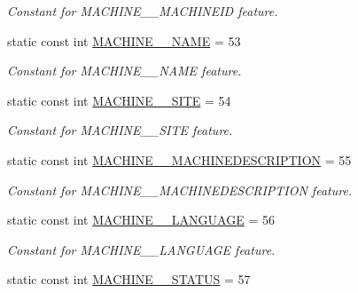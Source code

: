 \begin{DoxyCompactItemize}
\begin{DoxyCompactList}\small\item\em Constant for MACHINE\_\-\_\-MACHINEID feature. \item\end{DoxyCompactList}\item 
\hypertarget{classUMS__Data_1_1UMS__DataPackage_a709e9131404d168e154a3155b55ec1d5}{
static const int \hyperlink{classUMS__Data_1_1UMS__DataPackage_a709e9131404d168e154a3155b55ec1d5}{MACHINE\_\-\_\-NAME} = 53}
\label{classUMS__Data_1_1UMS__DataPackage_a709e9131404d168e154a3155b55ec1d5}

\begin{DoxyCompactList}\small\item\em Constant for MACHINE\_\-\_\-NAME feature. \item\end{DoxyCompactList}\item 
\hypertarget{classUMS__Data_1_1UMS__DataPackage_ab523a3b17f4a08d408d1b61e1726c60c}{
static const int \hyperlink{classUMS__Data_1_1UMS__DataPackage_ab523a3b17f4a08d408d1b61e1726c60c}{MACHINE\_\-\_\-SITE} = 54}
\label{classUMS__Data_1_1UMS__DataPackage_ab523a3b17f4a08d408d1b61e1726c60c}

\begin{DoxyCompactList}\small\item\em Constant for MACHINE\_\-\_\-SITE feature. \item\end{DoxyCompactList}\item 
\hypertarget{classUMS__Data_1_1UMS__DataPackage_a7cda61ff5d9dece8afad4d16776e51de}{
static const int \hyperlink{classUMS__Data_1_1UMS__DataPackage_a7cda61ff5d9dece8afad4d16776e51de}{MACHINE\_\-\_\-MACHINEDESCRIPTION} = 55}
\label{classUMS__Data_1_1UMS__DataPackage_a7cda61ff5d9dece8afad4d16776e51de}

\begin{DoxyCompactList}\small\item\em Constant for MACHINE\_\-\_\-MACHINEDESCRIPTION feature. \item\end{DoxyCompactList}\item 
\hypertarget{classUMS__Data_1_1UMS__DataPackage_a74d6532b8aac13673a93c73aa7936c69}{
static const int \hyperlink{classUMS__Data_1_1UMS__DataPackage_a74d6532b8aac13673a93c73aa7936c69}{MACHINE\_\-\_\-LANGUAGE} = 56}
\label{classUMS__Data_1_1UMS__DataPackage_a74d6532b8aac13673a93c73aa7936c69}

\begin{DoxyCompactList}\small\item\em Constant for MACHINE\_\-\_\-LANGUAGE feature. \item\end{DoxyCompactList}\item 
\hypertarget{classUMS__Data_1_1UMS__DataPackage_ab1c32da746e1d9ae4ab7d11edfe52365}{
static const int \hyperlink{classUMS__Data_1_1UMS__DataPackage_ab1c32da746e1d9ae4ab7d11edfe52365}{MACHINE\_\-\_\-STATUS} = 57}
\label{classUMS__Data_1_1UMS__DataPackage_ab1c32da746e1d9ae4ab7d11edfe52365}


\end{DoxyCompactItemize}
